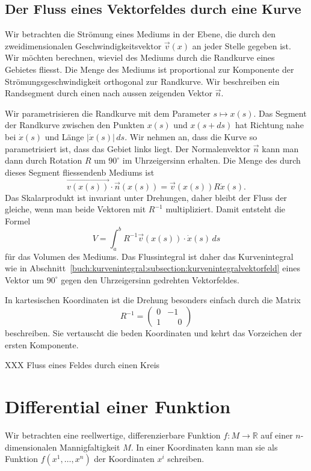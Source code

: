 %
%
\subsection{Der Fluss eines Vektorfeldes durch eine Kurve}
Wir betrachten die Strömung eines Mediums in der Ebene, die durch
den zweidimensionalen Geschwindigkeitsvektor $\vec{v}(x)$ an jeder
Stelle gegeben ist.
Wir möchten berechnen, wieviel des Mediums durch die Randkurve
eines Gebietes fliesst.
Die Menge des Mediums ist proportional zur Komponente der
Strömungsgeschwindigkeit orthogonal zur Randkurve.
Wir beschreiben ein Randsegment durch einen nach aussen
zeigenden Vektor $\vec{n}$.

Wir parametrisieren die Randkurve mit dem Parameter $s\mapsto x(s)$.
Das Segment der Randkurve zwischen den Punkten $x(s)$ und $x(s+ds)$
hat Richtung nahe bei $\dot{x}(s)$ und Länge $|\dot{x}(s)|\,ds$.
Wir nehmen an, dass die Kurve so parametrisiert ist, dass das Gebiet
links liegt.
Der Normalenvektor $\vec{n}$ kann man dann durch Rotation $R$ um
$90^\circ$ im Uhrzeigersinn erhalten.
Die Menge des durch dieses Segment fliessendenb Mediums ist
\[
\vec{v(x(s))}\cdot \vec{n}(x(s))
=
\vec{v}(x(s)) R\dot{x}(s).
\]
Das Skalarprodukt ist invariant unter Drehungen, daher bleibt der
Fluss der gleiche, wenn man beide Vektoren mit $R^{-1}$ multipliziert.
Damit entsteht die Formel
\[
V
=
\int_a^b 
R^{-1}\vec{v}(x(s))\cdot \dot{x}(s)
\,ds
\]
für das Volumen des Mediums.
Das Flussintegral ist daher das Kurvenintegral wie in
Abschnitt~\ref{buch:kurvenintegral:subsection:kurvenintegralvektorfeld}
eines Vektor um $90^\circ$ gegen den Uhrzeigersinn gedrehten
Vektorfeldes.

In kartesischen Koordinaten ist die Drehung besonders einfach durch
die Matrix 
\[
R^{-1}
=
\begin{pmatrix}
0&-1\\
1&\phantom{-}0
\end{pmatrix}
\]
beschreiben.
Sie vertauscht die beden Koordinaten und kehrt das Vorzeichen
der ersten Komponente.

\begin{beispiel}
XXX Fluss eines Feldes durch einen Kreis
\end{beispiel}

%
%
\section{Differential einer Funktion}
Wir betrachten eine reellwertige, differenzierbare Funktion
$f\colon M\to\mathbb{R}$ auf einer $n$-dimensionalen 
Mannigfaltigkeit $M$.
In einer Koordinaten kann man sie als Funktion 
$f(x^1,\dots,x^n)$ der Koordinaten $x^i$ schreiben.

